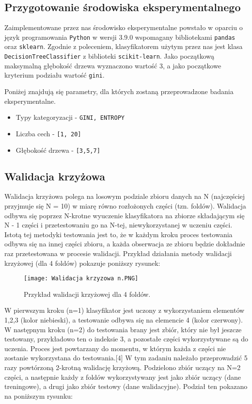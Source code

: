 \documentclass{article}
\begin{document}
\subsection{Przygotowanie środowiska eksperymentalnego}
\quad Zaimplementowane przez nas środowisko eksperymentalne powstało w oparciu o język programowania \texttt{Python} w wersji 3.9.0 wspomagany bibliotekami \texttt{pandas} oraz \texttt{sklearn}. Zgodnie z poleceniem, klasyfikatorem użytym przez nas jest klasa \texttt{DecisionTreeClassifier} z biblioteki \texttt{scikit-learn}. Jako początkową maksymalną głębokość drzewa wyznaczono wartość 3, a jako początkowe kryterium podziału wartość \texttt{gini}. 

Poniżej znajdują się parametry, dla których zostaną przeprowadzone badania eksperymentalne.

\begin{itemize}
    \item Typy kategoryzacji - \texttt{GINI, ENTROPY}
    \item Liczba cech - \texttt{[1, 20]}
    \item Głębokość drzewa - \texttt{[3,5,7]}
\end{itemize}

\subsection{Walidacja krzyżowa}
\quad Walidacja krzyżowa polega na losowym podziale zbioru danych na N (najczęściej przyjmuje się N = 10) w miarę równo rozłożonych części (tzn. foldów). Walidacja odbywa się poprzez N-krotne wyuczenie klasyfikatora na zbiorze składającym się N - 1 części i przetestowaniu go na N-tej, niewykorzystanej w uczeniu części. Istotą tej metodyki testowania jest to, że w każdym kroku proces testowania odbywa się na innej części zbioru, a każda obserwacja ze zbioru będzie dokładnie raz przetestowana w procesie walidacji. Przykład działania metody walidacji krzyżowej (dla 4 foldów) pokazuje poniższy rysunek:

\begin{figure}[ht]
    \centering
    \noindent 
    \vspace{.2cm}
    \texttt{[image: Walidacja krzyzowa n.PNG]}
    \caption{Przykład walidacji krzyżowej dla 4 foldów.}
    \label{fig:walidacja1}
\end{figure}

W pierwszym kroku (n=1) klasyfikator jest uczony z wykorzystaniem elementów 1,2,3 (kolor niebieski), a testowanie odbywa się na elemencie 4 (kolor czerwony). W następnym kroku (n=2) do testowania brany jest zbiór, który nie był jeszcze testowany, przykładowo ten o indeksie 3, a pozostałe części wykorzystywane są do uczenia. Proces jest powtarzany do momentu, w którym każda z części nie zostanie wykorzystana do testowania.[4]
\newpage
W tym zadaniu należało przeprowadzić 5 razy powtórzoną 2-krotną walidację krzyżową. Podzielono zbiór uczący na N=2 części, a następnie każdy z foldów wykorzystywany jest jako zbiór uczący (dane treningowe), a drugi jako zbiór testowy (dane walidacyjne). Podział ten pokazano na poniższym rysunku:
\end{document}
